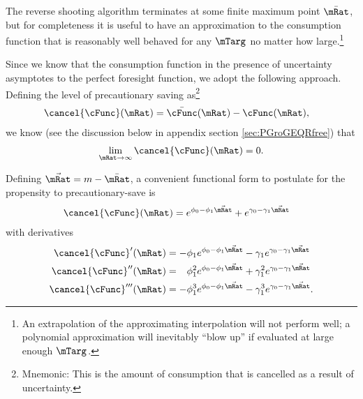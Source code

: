 \documentclass{handout}
\begin{document}
The reverse shooting algorithm terminates at some finite maximum point $\bar\mRat$, but for completeness 
it is useful to have an approximation to the consumption function that is reasonably well behaved
for any $\mTarg^{\null}$ no matter how large.\footnote{An extrapolation of the approximating interpolation will 
not perform well; a polynomial approximation will inevitably ``blow up'' if evaluated at large enough $\mTarg^{\null}$.}

Since we know that the consumption function in the presence of uncertainty asymptotes to the 
perfect foresight function, we adopt the following approach.  Defining the level of precautionary
saving as\footnote{Mnemonic: This is the amount of consumption that is cancelled as a result of uncertainty.}
\newcommand{\psav}{\cancel{c}}
\newcommand{\psavFunc}{\ensuremath{\cancel{\cFunc}}}
\begin{equation}\begin{gathered}\begin{aligned}
  \label{eq:pSavFunc}
  \psavFunc(\mRat) & =  \bar{\cFunc}(\mRat)-\cFunc(\mRat),
\end{aligned}\end{gathered}\end{equation}
we know (see the discussion below in appendix section \ref{sec:PGroGEQRfree}) that 
\begin{equation}\begin{gathered}\begin{aligned}
  \lim_{\mRat \rightarrow \infty} \psavFunc(\mRat) = 0
.
\end{aligned}\end{gathered}\end{equation}

Defining $\vec{\mRat}=m-\bar{\mRat}$, a convenient functional form to postulate for the
propensity to precautionary-save is
\begin{equation}\begin{gathered}\begin{aligned}
  \psavFunc(\mRat) & =  e^{\phi_{0}-\phi_{1} \vec{\mRat}}+e^{\gamma_{0}-\gamma_{1} \vec{\mRat}}
\end{aligned}\end{gathered}\end{equation}
with derivatives
\begin{equation}\begin{gathered}\begin{aligned}
    \psavFunc^{\prime}(\mRat) & =  -\phi_{1} e^{\phi_{0}-\phi_{1} \vec{\mRat}} - \gamma_{1} e^{\gamma_{0}-\gamma_{1} \vec{\mRat}}
\\  \psavFunc^{\prime\prime}(\mRat) & =  \phantom{-}\phi_{1}^{2} e^{\phi_{0}-\phi_{1} \vec{\mRat}} + \gamma_{1}^{2} e^{\gamma_{0}-\gamma_{1} \vec{\mRat}}
\\  \psavFunc^{\prime\prime\prime}(\mRat) & =  -\phi_{1}^{3} e^{\phi_{0}-\phi_{1} \vec{\mRat}} - \gamma_{1}^{3} e^{\gamma_{0}-\gamma_{1} \vec{\mRat}}
.
\end{aligned}\end{gathered}\end{equation}
\end{document}
